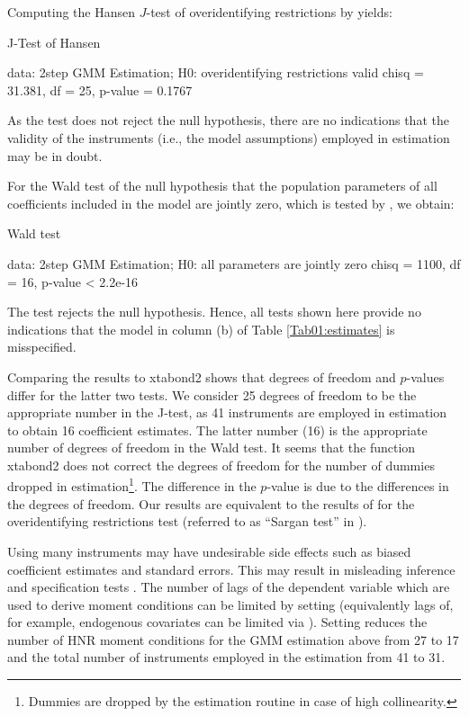 Computing the Hansen $J$-test of overidentifying restrictions by  yields:
\begin{example}
        J-Test of Hansen

data:  2step GMM Estimation; H0: overidentifying restrictions valid
chisq = 31.381, df = 25, p-value = 0.1767
\end{example}
As the test does not reject the null hypothesis, there are no indications that the validity of the instruments (i.e., the model assumptions) employed in estimation may be in doubt.

For the Wald test of the null hypothesis that the population parameters of all coefficients included in the model are jointly zero, which is tested by , we obtain:
\begin{example}
        Wald test

data:  2step GMM Estimation; H0: all parameters are jointly zero
chisq = 1100, df = 16, p-value < 2.2e-16
\end{example}
The test rejects the null hypothesis.
Hence, all tests shown here provide no indications that the model in column (b) of Table \ref{Tab01:estimates} is misspecified.



Comparing the results to xtabond2 shows that degrees of freedom and $p$-values differ for the latter two tests. We consider 25 degrees of freedom to be the appropriate number in the J-test, as 41 instruments are employed in estimation to obtain 16 coefficient estimates. The latter number (16) is the appropriate number of degrees of freedom in the Wald test. It seems that the function xtabond2 does not correct the degrees of freedom for the number of dummies dropped in estimation\footnote{Dummies are dropped by the estimation routine in case of high collinearity.}. The difference in the $p$-value is due to the differences in the degrees of freedom. Our results are equivalent to the results of  for the overidentifying restrictions test (referred to as ``Sargan test'' in ).

Using many instruments may have undesirable side effects such as biased coefficient estimates and standard errors. This may result in misleading inference and specification tests \citep[see, e.g.,][]{Roo2009}. The number of lags of the dependent variable which are used to derive moment conditions can be limited by setting  (equivalently lags of, for example, endogenous covariates can be limited via ). Setting  reduces the number of HNR moment conditions for the GMM estimation above from 27 to 17 and the total number of instruments employed in the estimation from 41 to 31.









